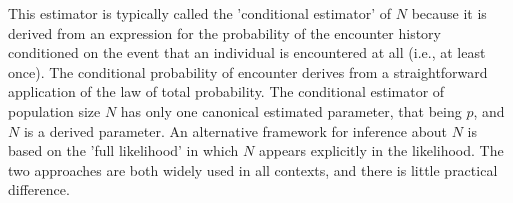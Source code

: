 \documentclass{book}
\begin{document}

This estimator is typically called the 'conditional estimator' of $N$
because it is derived from an expression for the probability of the
encounter history conditioned on the event that an individual is
encountered at all (i.e., at least once).  The conditional probability
of encounter derives from a straightforward application of the law of
total probability.  The conditional estimator of population size $N$
has only one canonical estimated parameter, that being $p$, and $N$ is
a derived parameter. An alternative framework for inference about $N$
is based on the 'full likelihood' in which $N$ appears explicitly in
the likelihood.  The two approaches are both widely used in all
contexts, and there is little practical difference.

\end{document}
